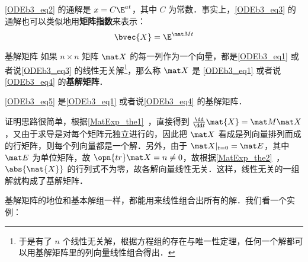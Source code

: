 \autoref{ODEb3_eq2} 的通解是 $x=C\E^{at}$，其中 $C$ 为常数．事实上，\autoref{ODEb3_eq3} 的通解也可以类似地用\textbf{矩阵指数}来表示：
\begin{equation}\label{ODEb3_eq5}
\bvec{X}=\E^{\mat Mt}
\end{equation}

\begin{definition}{基解矩阵}
如果 $n\times n$ 矩阵 $\mat X$ 的每一列作为一个向量，都是\autoref{ODEb3_eq1} 或者说\autoref{ODEb3_eq3} 的线性无关解\footnote{于是有了 $n$ 个线性无关解，根据方程组的存在与唯一性定理，任何一个解都可以用基解矩阵里的列向量线性组合得出．}，那么称 $\mat X$ 是 \autoref{ODEb3_eq1} 或者说\autoref{ODEb3_eq4} 的\textbf{基解矩阵}．
\end{definition}

\begin{theorem}{}
\autoref{ODEb3_eq5} 是\autoref{ODEb3_eq1} 或者说\autoref{ODEb3_eq4} 的基解矩阵．
\end{theorem}

证明思路很简单，根据\autoref{MatExp_the1}~，直接得到 $\frac{\dd}{\dd t}\mat{X}=\mat M\mat X$，又由于求导是对每个矩阵元独立进行的，因此把 $\mat X$ 看成是列向量排列而成的行矩阵，则每个列向量都是一个解．另外，由于 $\mat X|_{t=0}=\mat E$，其中 $\mat E$ 为单位矩阵，故 $\opn{tr}\mat X=n\not=0$，故根据\autoref{MatExp_the2}~，$\abs{\mat{X}}$ 的行列式不为零，故各解向量线性无关．这样，线性无关的一组解就构成了基解矩阵．


基解矩阵的地位和基本解组一样，都能用来线性组合出所有的解．我们看一个实例：

